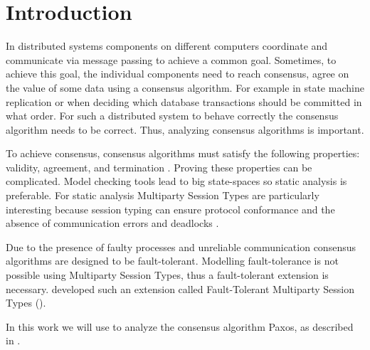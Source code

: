 \chapter{Introduction}
In distributed systems components on different computers coordinate and communicate via message passing to achieve a common goal.
Sometimes, to achieve this goal, the individual components need to reach consensus, \ie agree on the value of some data using a consensus algorithm.
For example in state machine replication or when deciding which database transactions should be committed in what order.
For such a distributed system to behave correctly the consensus algorithm needs to be correct.
Thus, analyzing consensus algorithms is important.

To achieve consensus, consensus algorithms must satisfy the following properties: validity, agreement, and termination \cite{CoulourisEtal01}.
Proving these properties can be complicated.
Model checking tools lead to big state-spaces so static analysis is preferable.
For static analysis Multiparty Session Types are particularly interesting because session typing can ensure protocol conformance and the absence of communication errors and deadlocks \cite{ScalasEtal18}.

Due to the presence of faulty processes and unreliable communication consensus algorithms are designed to be fault-tolerant.
Modelling fault-tolerance is not possible using Multiparty Session Types, thus a fault-tolerant extension is necessary.
\citeauthor{PetersEtal21} developed such an extension called Fault-Tolerant Multiparty Session Types (\FTMPST).

In this work we will use \FTMPST to analyze the consensus algorithm Paxos, as described in \cite{Lamport01}.



